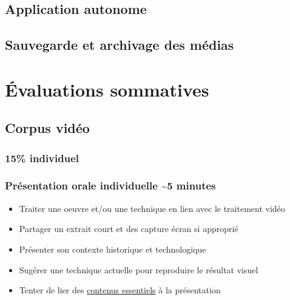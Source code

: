 \documentclass[
]{book}
\providecommand{\tightlist}{%
  \setlength{\itemsep}{0pt}\setlength{\parskip}{0pt}}
\begin{document}
\hypertarget{application-autonome}{%
\section{Application autonome}\label{application-autonome}}

\hypertarget{sauvegarde-et-archivage-des-muxe9dias}{%
\section{Sauvegarde et archivage des médias}\label{sauvegarde-et-archivage-des-muxe9dias}}

\hypertarget{uxe9valuations-sommatives}{%
\chapter{Évaluations sommatives}\label{uxe9valuations-sommatives}}

\hypertarget{evaluation_1}{%
\section{Corpus vidéo}\label{evaluation_1}}

\hypertarget{individuel}{%
\subsection{15\% individuel}\label{individuel}}

\hypertarget{pruxe9sentation-orale-individuelle-5-minutes}{%
\subsection{Présentation orale individuelle \textasciitilde5 minutes}\label{pruxe9sentation-orale-individuelle-5-minutes}}

\begin{itemize}
\tightlist
\item
  Traiter une oeuvre et/ou une technique en lien avec le traitement vidéo\\
\item
  Partager un extrait court et des capture écran si approprié
\item
  Présenter son contexte historique et technologique
\item
  Sugérer une technique actuelle pour reproduire le résultat visuel
\item
  Tenter de lier des \protect\hyperlink{contenus_essentiels}{contenus essentiels} à la présentation
\end{itemize}
\end{document}
